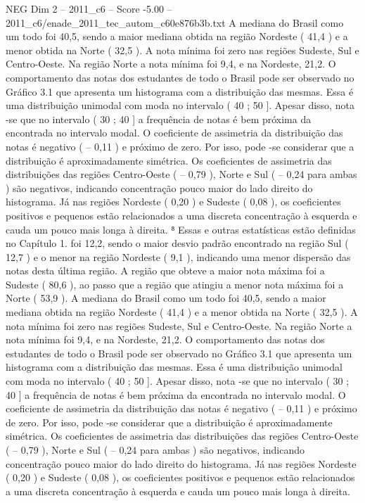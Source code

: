 \begin{textsample}{NEG Dim 2 – 2011\_c6 – Score -5.00 – 2011\_c6/enade\_2011\_tec\_autom\_c60e876b3b.txt}
A mediana do Brasil como um todo foi 40,5, sendo a maior mediana obtida na região Nordeste ( 41,4 ) e a menor obtida na Norte ( 32,5 ).
A nota mínima foi zero nas regiões Sudeste, Sul e Centro-Oeste.
Na região Norte a nota mínima foi 9,4, e na Nordeste, 21,2.
O comportamento das notas dos estudantes de todo o Brasil pode ser observado no Gráfico 3.1 que apresenta um histograma com a distribuição das mesmas.
Essa é uma distribuição unimodal com moda no intervalo ( 40 ; 50 ].
Apesar disso, nota -se que no intervalo ( 30 ; 40 ] a frequência de notas é bem próxima da encontrada no intervalo modal.
O coeficiente de assimetria da distribuição das notas é negativo ( – 0,11 ) e próximo de zero.
Por isso, pode -se considerar que a distribuição é aproximadamente simétrica.
Os coeficientes de assimetria das distribuições das regiões Centro-Oeste ( – 0,79 ), Norte e Sul ( – 0,24 para ambas ) são negativos, indicando concentração pouco maior do lado direito do histograma.
Já nas regiões Nordeste ( 0,20 ) e Sudeste ( 0,08 ), os coeficientes positivos e pequenos estão relacionados a uma discreta concentração à esquerda e cauda um pouco mais longa à direita. ⁸ Essas e outras estatísticas estão definidas no Capítulo 1. foi 12,2, sendo o maior desvio padrão encontrado na região Sul ( 12,7 ) e o menor na região Nordeste ( 9,1 ), indicando uma menor dispersão das notas desta última região.
A região que obteve a maior nota máxima foi a Sudeste ( 80,6 ), ao passo que a região que atingiu a menor nota máxima foi a Norte ( 53,9 ).
A mediana do Brasil como um todo foi 40,5, sendo a maior mediana obtida na região Nordeste ( 41,4 ) e a menor obtida na Norte ( 32,5 ).
A nota mínima foi zero nas regiões Sudeste, Sul e Centro-Oeste.
Na região Norte a nota mínima foi 9,4, e na Nordeste, 21,2.
O comportamento das notas dos estudantes de todo o Brasil pode ser observado no Gráfico 3.1 que apresenta um histograma com a distribuição das mesmas.
Essa é uma distribuição unimodal com moda no intervalo ( 40 ; 50 ].
Apesar disso, nota -se que no intervalo ( 30 ; 40 ] a frequência de notas é bem próxima da encontrada no intervalo modal.
O coeficiente de assimetria da distribuição das notas é negativo ( – 0,11 ) e próximo de zero.
Por isso, pode -se considerar que a distribuição é aproximadamente simétrica.
Os coeficientes de assimetria das distribuições das regiões Centro-Oeste ( – 0,79 ), Norte e Sul ( – 0,24 para ambas ) são negativos, indicando concentração pouco maior do lado direito do histograma.
Já nas regiões Nordeste ( 0,20 ) e Sudeste ( 0,08 ), os coeficientes positivos e pequenos estão relacionados a uma discreta concentração à esquerda e cauda um pouco mais longa à direita.

\end{textsample}
